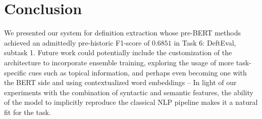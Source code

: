 \documentclass[11pt]{article}
\begin{document}
\section{Conclusion}
We presented our system for definition extraction whose pre-BERT methods achieved an admittedly pre-historic F1-score of $0.6851$ in
Task 6: DeftEval, subtask 1. Future work could potentially include the customization of the architecture to incorporate ensemble training,
exploring the usage of more task-specific cues such as topical information, and perhaps even becoming one with the BERT side and using contextualized word embeddings -- In light of our experiments with the combination of syntactic and semantic features, the ability of the
model to implicitly reproduce the classical NLP pipeline \cite{tenney2019bert} makes it a natural fit for the task.

\newpage


\end{document}
